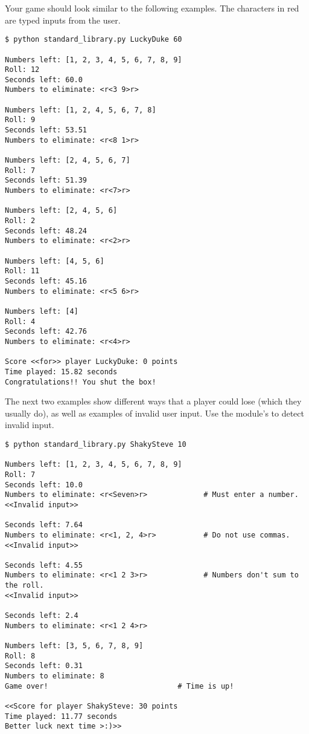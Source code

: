 \begin{problem}
Your game should look similar to the following examples.
The characters in red are typed inputs from the user.

\begin{lstlisting}
$ python standard_library.py LuckyDuke 60

Numbers left: [1, 2, 3, 4, 5, 6, 7, 8, 9]
Roll: 12
Seconds left: 60.0
Numbers to eliminate: <r<3 9>r>

Numbers left: [1, 2, 4, 5, 6, 7, 8]
Roll: 9
Seconds left: 53.51
Numbers to eliminate: <r<8 1>r>

Numbers left: [2, 4, 5, 6, 7]
Roll: 7
Seconds left: 51.39
Numbers to eliminate: <r<7>r>

Numbers left: [2, 4, 5, 6]
Roll: 2
Seconds left: 48.24
Numbers to eliminate: <r<2>r>

Numbers left: [4, 5, 6]
Roll: 11
Seconds left: 45.16
Numbers to eliminate: <r<5 6>r>

Numbers left: [4]
Roll: 4
Seconds left: 42.76
Numbers to eliminate: <r<4>r>

Score <<for>> player LuckyDuke: 0 points
Time played: 15.82 seconds
Congratulations!! You shut the box!
\end{lstlisting}

The next two examples show different ways that a player could lose (which they usually do), as well as examples of invalid user input.
Use the  module's  to detect invalid input.

\begin{lstlisting}
$ python standard_library.py ShakySteve 10

Numbers left: [1, 2, 3, 4, 5, 6, 7, 8, 9]
Roll: 7
Seconds left: 10.0
Numbers to eliminate: <r<Seven>r>             # Must enter a number.
<<Invalid input>>

Seconds left: 7.64
Numbers to eliminate: <r<1, 2, 4>r>           # Do not use commas.
<<Invalid input>>

Seconds left: 4.55
Numbers to eliminate: <r<1 2 3>r>             # Numbers don't sum to the roll.
<<Invalid input>>

Seconds left: 2.4
Numbers to eliminate: <r<1 2 4>r>

Numbers left: [3, 5, 6, 7, 8, 9]
Roll: 8
Seconds left: 0.31
Numbers to eliminate: 8
Game over!                              # Time is up!

<<Score for player ShakySteve: 30 points
Time played: 11.77 seconds
Better luck next time >:)>>
\end{lstlisting}


\end{problem}
